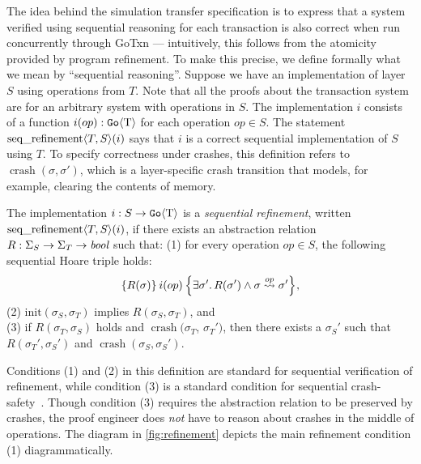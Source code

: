 The idea behind the simulation transfer specification is to express that a system
verified using sequential reasoning for each transaction is also correct when
run concurrently through GoTxn --- intuitively, this follows from the atomicity
provided by program refinement.
To make this precise, we define formally what we mean by
``sequential reasoning''. Suppose we have an
implementation of layer $S$ using operations from $T$. Note that all the proofs
about the transaction system are for an arbitrary system with operations in $S$. The implementation $i$
consists of a function $i(op) : \mathtt{Go}\langle \mathrm{T} \rangle$ for each operation $op \in S$. The statement
$\operatorname{seq\_refinement} \langle T, S \rangle(i)$ says that $i$ is a correct sequential
implementation of $S$ using $T$. To specify correctness under crashes, this
definition refers to $\operatorname{crash}(\sigma, \sigma')$, which is a
layer-specific crash transition that models, for example, clearing the
contents of memory.

\begin{definition}
  The implementation $i : S \to \mathtt{Go}\langle \mathrm{T} \rangle$ is a \emph{sequential
    refinement}, written
  $\operatorname{seq\_refinement} \langle T, S \rangle(i)$, if there exists an abstraction relation
  $R : \Sigma_{S} \to \Sigma_{T} \to \textit{bool}$ such that: \newline
(1) for every operation
  $op \in S$, the following sequential Hoare triple holds:
  \[
    \hoare{R(\sigma)}{i(op)}{\exists \sigma'.\, R(\sigma') \land \sigma \overset{op}{\leadsto} \sigma'},
  \]
(2) $\mathrm{init}(\sigma_{S}, \sigma_{T})$ implies
$R(\sigma_{S}, \sigma_{T})$, and \\
(3) if $R(\sigma_{T}, \sigma_{S})$ holds and $\operatorname{crash}(\sigma_{T}$, $\sigma_{T}')$,
then there exists a $\sigma_{S}'$ such that $R(\sigma_{T}', \sigma_{S}')$ and
$\operatorname{crash}(\sigma_{S}, \sigma_{S}')$.%
  \label{def:seqrefinement}
\end{definition}
%
Conditions (1) and (2) in this definition are standard for sequential
verification of refinement, while condition (3) is a standard condition for sequential crash-safety~\citep{chajed:argosy}. Though condition (3) requires the
abstraction relation to be preserved by crashes, the proof engineer does \emph{not} have to reason about crashes in the middle of operations.
The
diagram in \cref{fig:refinement} depicts the main
refinement condition (1) diagrammatically. 

